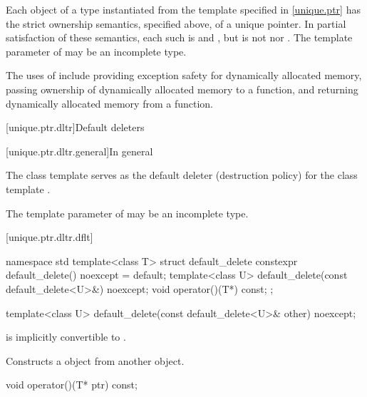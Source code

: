 \pnum
Each object of a type  instantiated from the  template
specified in \ref{unique.ptr} has the strict ownership semantics, specified above,
of a unique pointer. In partial satisfaction of these semantics, each such 
is  and , but is not
 nor .
The template parameter  of  may be an incomplete type.

\pnum
\begin{note}
The uses
of  include providing exception safety for
dynamically allocated memory, passing ownership of dynamically allocated
memory to a function, and returning dynamically allocated memory from a
function.
\end{note}

[unique.ptr.dltr]{Default deleters}

[unique.ptr.dltr.general]{In general}

\pnum
The class template  serves as the default deleter (destruction policy)
for the class template .

\pnum
The template parameter  of  may be
an incomplete type.

[unique.ptr.dltr.dflt]{}

\begin{codeblock}
namespace std {
  template<class T> struct default_delete {
    constexpr default_delete() noexcept = default;
    template<class U> default_delete(const default_delete<U>&) noexcept;
    void operator()(T*) const;
  };
}
\end{codeblock}

%
\begin{itemdecl}
template<class U> default_delete(const default_delete<U>& other) noexcept;
\end{itemdecl}

\begin{itemdescr}
\pnum
\constraints
{} is implicitly convertible to .

\pnum
\effects
Constructs a  object
from another  object.
\end{itemdescr}

%
\begin{itemdecl}
void operator()(T* ptr) const;
\end{itemdecl}

